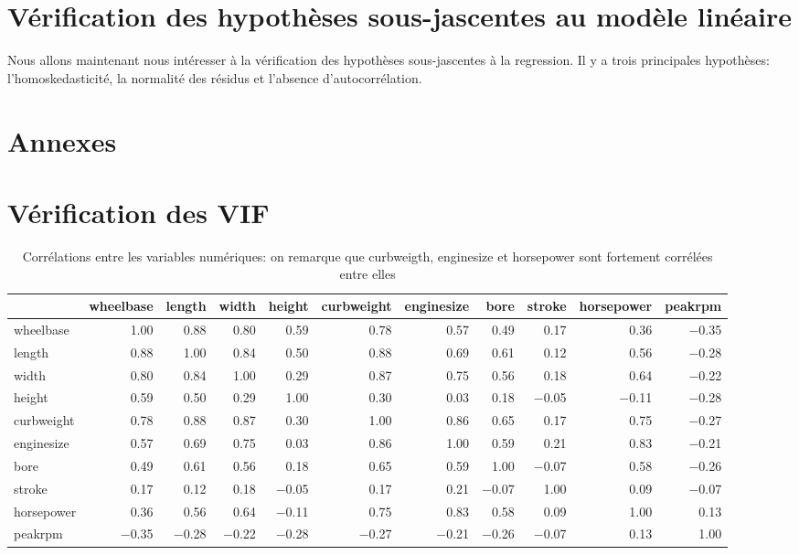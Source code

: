 \documentclass[11pt,a4paper]{article}
\begin{document}
\section{Vérification des hypothèses sous-jascentes au modèle linéaire}
Nous allons maintenant nous intéresser à la vérification des hypothèses sous-jascentes à la regression.
Il y a trois principales hypothèses: l'homoskedasticité, la normalité des résidus et l'absence d'autocorrélation.

\section{Annexes}
\appendix
\section{Vérification des VIF}
\begin{table}
	\scriptsize
	\centering
	\begin{tabulary}{1\textwidth}{|L|R|R|R|R|R|R|R|R|R|R|}
	\hline
 &    wheelbase &    length &    width &    height &    curbweight &    enginesize &    bore &    stroke &    horsepower &    peakrpm\\\hline

wheelbase &    1.00 &    0.88 &    0.80 &    0.59 &    0.78 &    0.57 &    0.49 &    0.17 &    0.36 &    $-$0.35\\\hline
length &    0.88 &    1.00 &    0.84 &    0.50 &    0.88 &    0.69 &    0.61 &    0.12 &    0.56 &    $-$0.28\\\hline
width &    0.80 &    0.84 &    1.00 &    0.29 &    0.87 &    0.75 &    0.56 &    0.18 &    0.64 &    $-$0.22\\\hline
height &    0.59 &    0.50 &    0.29 &    1.00 &    0.30 &    0.03 &    0.18 &    $-$0.05 &    $-$0.11 &    $-$0.28\\\hline
curbweight &    0.78 &    0.88 &    0.87 &    0.30 &    1.00 &    0.86 &    0.65 &    0.17 &    0.75 &    $-$0.27\\\hline
enginesize &    0.57 &    0.69 &    0.75 &    0.03 &    0.86 &    1.00 &    0.59 &    0.21 &    0.83 &    $-$0.21\\\hline
bore &    0.49 &    0.61 &    0.56 &    0.18 &    0.65 &    0.59 &    1.00 &    $-$0.07 &    0.58 &    $-$0.26\\\hline
stroke &    0.17 &    0.12 &    0.18 &    $-$0.05 &    0.17 &    0.21 &    $-$0.07 &    1.00 &    0.09 &    $-$0.07\\\hline
horsepower &    0.36 &    0.56 &    0.64 &    $-$0.11 &    0.75 &    0.83 &    0.58 &    0.09 &    1.00 &    0.13\\\hline
peakrpm &    $-$0.35 &    $-$0.28 &    $-$0.22 &    $-$0.28 &    $-$0.27 &    $-$0.21 &    $-$0.26 &    $-$0.07 &    0.13 &    1.00\\\hline

	
\end{tabulary}
			\caption{Corrélations entre les variables numériques: on remarque que curbweigth, enginesize et horsepower sont fortement corrélées entre elles}
			\label{table:corrvif}
		\end{table}
\end{document}
